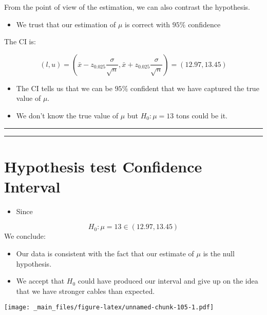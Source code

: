 \documentclass[
]{book}
\providecommand{\tightlist}{%
  \setlength{\itemsep}{0pt}\setlength{\parskip}{0pt}}
\begin{document}
From the point of view of the estimation, we can also contrast the hypothesis.

\begin{itemize}
\tightlist
\item
  We trust that our estimation of \(\mu\) is correct with \(95\%\) confidence
\end{itemize}

The CI is:

\[(l,u)=(\bar{x}-z_{0.025} \frac{\sigma}{\sqrt{n}}, \bar{x}+z_{0.025} \frac{\sigma}{\sqrt{n}})= (12.97,13.45)\]

\begin{itemize}
\item
  The CI tells us that we can be \(95\%\) confident that we have captured the true value of \(\mu\).
\item
  We don't know the true value of \(\mu\) but \(H_0: \mu=13\) tons could be it.
\end{itemize}

\begin{center}\rule{0.5\linewidth}{0.5pt}\end{center}

\begin{center}\rule{0.5\linewidth}{0.5pt}\end{center}

\hypertarget{hypothesis-test-confidence-interval-1}{%
\section{Hypothesis test Confidence Interval}\label{hypothesis-test-confidence-interval-1}}

\begin{itemize}
\tightlist
\item
  Since
\end{itemize}

\[H_0: \mu=13 \in (12.97,13.45)\]
We conclude:

\begin{itemize}
\item
  Our data is consistent with the fact that our estimate of \(\mu\) is the null hypothesis.
\item
  We accept that \(H_0\) could have produced our interval and give up on the idea that we have stronger cables than expected.
\end{itemize}

\texttt{[image: \_main\_files/figure-latex/unnamed-chunk-105-1.pdf]}
\end{document}
